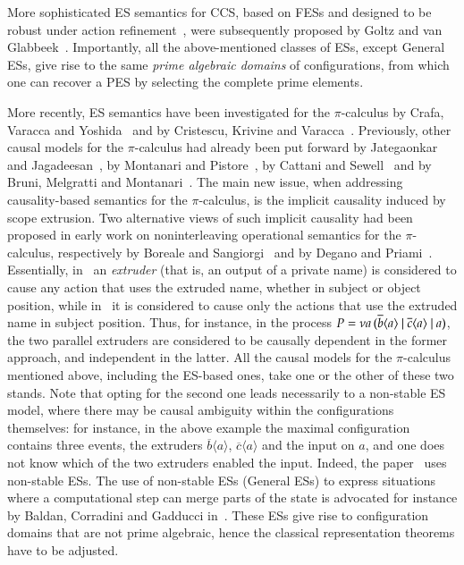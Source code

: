 More sophisticated ES semantics for CCS, based on FESs and designed to
be robust under action refinement~\cite{AH89,DD93,GGR96}, were 
subsequently  proposed by Goltz and van
Glabbeek~\cite{GG04}. Importantly, all the above-mentioned classes of
ESs, except General ESs, give rise to the same \emph{prime algebraic
  domains} of configurations, from which one can recover a PES by
selecting the complete prime elements.

More recently, ES semantics have been investigated for the
$\pi$-calculus by Crafa, Varacca and Yoshida~\cite{CVY07,VY10,CVY12}
and by Cristescu, Krivine and Varacca~\cite{Cri15,CKV15,CKV16}. 
Previously,  other
causal models for the $\pi$-calculus had already been put forward by
Jategaonkar and Jagadeesan~\cite{JJ95}, by Montanari and
Pistore~\cite{MP95}, by Cattani and Sewell~\cite{CS04} and by Bruni,
Melgratti and Montanari~\cite{BMM06}.  The main new issue, when
addressing causality-based semantics for the $\pi$-calculus, is the
implicit causality induced by scope extrusion. Two alternative views
of such implicit causality had been proposed in  early  work on
noninterleaving operational semantics for the $\pi$-calculus,
respectively by Boreale and Sangiorgi~\cite{BS98} and by Degano and
Priami~\cite{DP99}.  Essentially, in~\cite{BS98} an \emph{extruder}
(that is, an output of a private name) is considered to cause any
action that uses the extruded name, whether in subject or object
position, while in~\cite{DP99} it is considered to cause only the
actions that use the extruded name in subject position. Thus, for
instance, in the process $P = \nu a \,(\overline{b} \langle a\rangle
~|~ \overline{c} \langle a\rangle ~|~ a)$, the two parallel extruders
are considered to be causally dependent in the former approach, and
independent in the latter. All the causal models for the
$\pi$-calculus mentioned above, including the ES-based ones, take one
or the other of these two stands.  Note that opting for the second one
leads necessarily to a non-stable ES model, where there may be causal
ambiguity within the configurations themselves: for instance, in the
above example the maximal configuration contains three events, the
extruders $\overline{b}\langle a\rangle$, $\overline{c} \langle
a\rangle$ and the input on $a$, and one does not know which of the two
extruders enabled the input. Indeed, the paper~\cite{CVY12} uses
non-stable ESs.  The use of non-stable ESs (General ESs) to express
situations where a computational step can merge parts of the state is
advocated for instance by Baldan, Corradini and Gadducci
in~\cite{BCG17}. These ESs give rise to configuration domains that are
not prime algebraic, hence the classical representation theorems have
to be adjusted.

